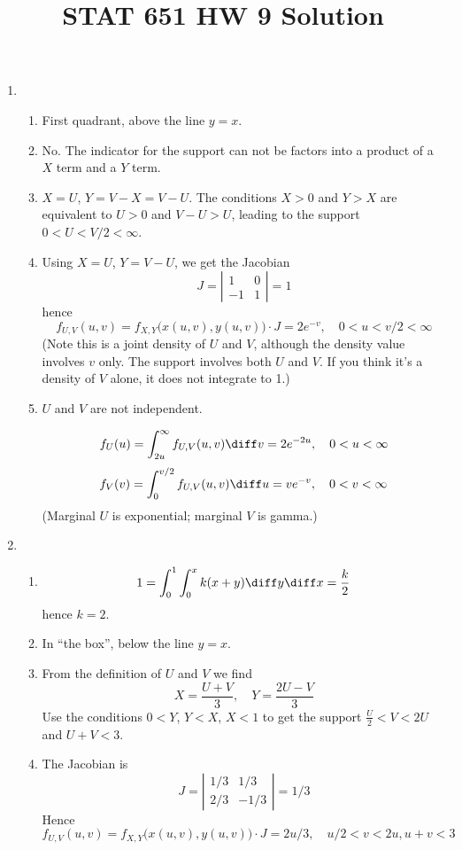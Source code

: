 \documentclass[12pt]{article}
\begin{document}
\title{STAT 651 HW 9 Solution}
\maketitle

\begin{enumerate}
\item
\begin{enumerate}
\item First quadrant, above the line $y = x$.
\item No. The indicator for the support can not be factors into
     a product of a $X$ term and a $Y$ term.
\item $X = U$, $Y = V - X = V - U$.
The conditions
$X > 0$ and $Y > X$ are equivalent to
$U > 0$ and $V - U > U$,
leading to the support
$0 < U < V/2 < \infty$.

\item
Using $X = U$, $Y = V - U$,
we get the Jacobian
\[
J = \left|\begin{matrix}1 & 0\\ -1 & 1\end{matrix}\right| = 1
\]
hence
\[
f_{U,V}(u,v)
= f_{X,Y}\bigl(x(u, v), y(u,v)\bigr) \cdot J
= 2e^{-v},
\quad
0 < u < v/2 < \infty
\]
(Note this is a joint density of $U$ and $V$,
although the density value involves $v$ only.
The support involves both $U$ and $V$.
If you think it's a density of $V$ alone,
it does not integrate to 1.)

\item $U$ and $V$ are not independent.

\[
f_U(u)
= \int_{2u}^{\infty} f_{U,V}(u,v) \diff v = 2e^{-2u},
\quad 0<u<\infty
\]
\[
f_V(v)
= \int_{0}^{v/2} f_{U,V}(u,v) \diff u = ve^{-v},
\quad 0<v<\infty
\]
(Marginal $U$ is exponential; marginal $V$ is gamma.)
\end{enumerate}
\item
\begin{enumerate}
\item
\[
1 = \int_0^1 \int_0^x k(x+y) \diff y \diff x = \frac{k}{2}
\]
hence $k = 2$.

\item
In ``the box'', below the line $y = x$.

\item
From the definition of $U$ and $V$ we find
\[
X = \frac{U + V}{3},\quad
Y = \frac{2U - V}{3}
\]
Use the conditions
$0 < Y$, $Y < X$, $X < 1$ to get the support
$\frac{U}{2} < V < 2U$ and $U+V < 3$.

\item
The Jacobian is
\[
J = \left|\begin{matrix}1/3 & 1/3\\ 2/3 & -1/3\end{matrix}\right|
= 1/3
\]
Hence
\[
f_{U,V}(u,v)
= f_{X,Y}\bigl(x(u,v), y(u,v)\bigr) \cdot J
= 2u/3,
\quad
u/2 < v < 2u, u+v < 3
\]


\end{enumerate}
\end{enumerate}
\end{document}
